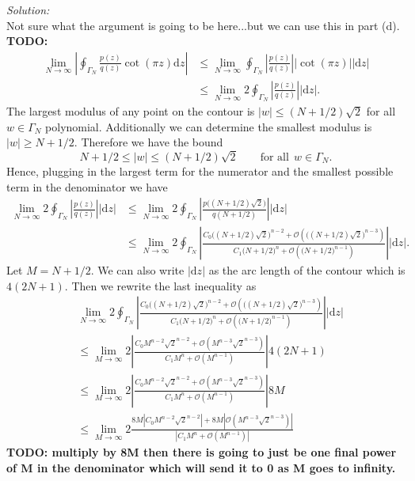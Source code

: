 \documentclass[10pt]{amsart}
\newcommand{\D}{\mathrm{d}}
\theoremstyle{nonumberplain}
\begin{document}
\begin{enumerate}[label={\bf {\arabic*}:}]
\begin{enumerate}
\noindent
\textit{Solution:} \\
Not sure what the argument is going to be here...but we can use this in part (d).
\textbf{TODO:}
\begin{align*}
\lim_{N \rightarrow \infty}\left| \oint_{\Gamma_N} \frac{p(z)}{q(z)} \cot (\pi z) \D z \right|
	&\leq \lim_{N \rightarrow \infty} \oint_{\Gamma_N} \left|\frac{p(z)}{q(z)}\right| |\cot (\pi z)| |\D z| \\
	&\leq \lim_{N \rightarrow \infty} 2 \oint_{\Gamma_N} \left|\frac{p(z)}{q(z)}\right| |\D z|.
\end{align*}
The largest modulus of any point on the contour is $|w| \leq (N + 1/2) \sqrt 2$ for all $w \in \Gamma_N$ polynomial.
Additionally we can determine the smallest modulus is $|w| \geq N + 1/2$.
Therefore we have the bound
$$
N + 1/2 \leq |w| \leq (N + 1/2)\sqrt 2 \quad\quad \text{for all} ~~ w \in \Gamma_N.
$$
Hence, plugging in the largest term for the numerator and the smallest possible term in the denominator we have
\begin{align*}
\lim_{N \rightarrow \infty} 2 \oint_{\Gamma_N} \left|\frac{p(z)}{q(z)}\right| |\D z|
	&\leq \lim_{N \rightarrow \infty} 2 \oint_{\Gamma_N} \left|\frac{p\big( (N + 1/2)\sqrt2 \big)}{q(N + 1/2)}\right| |\D z| \\
	&\leq \lim_{N \rightarrow \infty} 2 \oint_{\Gamma_N} \left| 
		\frac{ C_0 \Big( (N + 1/2)\sqrt2 \Big)^ {n - 2}
			+ \mathcal O \left(\Big( (N + 1/2)\sqrt2 \Big)^ {n - 3} \right)}
			{C_1 \Big( N + 1/2 \Big)^ n
			+ \mathcal O \left(\Big( N + 1/2 \Big)^ {n - 1} \right)}
		\right| |\D z|.
\end{align*}
Let $M = N + 1/2$.
We can also write $|\D z|$ as the arc length of the contour which is $4(2N + 1)$.
Then we rewrite the last inequality as
\begin{align*}
&\lim_{N \rightarrow \infty} 2 \oint_{\Gamma_N} \left| 
	\frac{ C_0 \Big( (N + 1/2)\sqrt2 \Big)^ {n - 2}
	+ \mathcal O \left(\Big( (N + 1/2)\sqrt2 \Big)^ {n - 3} \right)}
	{C_1 \Big( N + 1/2 \Big)^ n
	+ \mathcal O \left(\Big( N + 1/2 \Big)^ {n - 1} \right)}
	\right| |\D z| \\
&\leq \lim_{M \rightarrow \infty} 2 \left| 
	\frac{ C_0 M^{n - 2} \sqrt{2}^{n - 2}
	+ \mathcal O \left( M^{n - 3} \sqrt{2}^{n - 3} \right)}
	{C_1 M^n
	+ \mathcal O \left( M^{n-1} \right)}
	\right| 4(2N + 1) \\
&\leq \lim_{M \rightarrow \infty} 2 \left| 
	\frac{ C_0 M^{n - 2} \sqrt{2}^{n - 2}
	+ \mathcal O \left( M^{n - 3} \sqrt{2}^{n - 3} \right)}
	{C_1 M^n
	+ \mathcal O \left( M^{n-1} \right)}
	\right| 8M \\
&\leq \lim_{M \rightarrow \infty} 2 
	\frac{ 8M\left|C_0 M^{n - 2} \sqrt{2}^{n - 2}\right| + 8M\left|\mathcal O \left( M^{n - 3} \sqrt{2}^{n - 3} \right) \right|}
	{\left| C_1 M^n + \mathcal O \left( M^{n-1} \right) \right|}
\end{align*}
\textbf{TODO: multiply by 8M then there is going to just be one final power of M in the denominator which will send it to 0 as M goes to infinity.}


\end{enumerate}
\end{enumerate}
\end{document}
